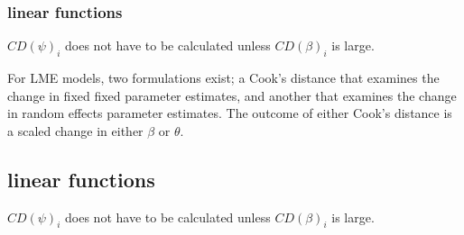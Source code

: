 \documentclass[12pt, a4paper]{article}
\begin{document}
\subsubsection{linear functions}

$CD(\psi)_i$ does not have to be calculated unless $CD(\beta)_i$ is large.

%

For LME models, two formulations exist; a Cook's distance that examines the change in fixed fixed parameter estimates, and another that examines the change in random effects parameter estimates. The outcome of either Cook's distance is a scaled change in either $\beta$ or $\theta$.


%
%
%
%
%
%



\subsection{linear functions}

$CD(\psi)_i$ does not have to be calculated unless $CD(\beta)_i$ is large.


%	
%	
\end{document}
